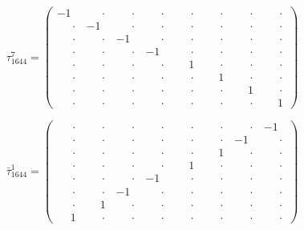 \documentclass[
  10pt,
]{article}
\begin{document}
\[
\tau_{1644}^{7} = \left(\begin{array}{rrrr|rrrr}
-1 & \phantom{-}\cdot & \phantom{-}\cdot & \phantom{-}\cdot & \phantom{-}\cdot & \phantom{-}\cdot & \phantom{-}\cdot & \phantom{-}\cdot \\[-1.8pt]
\phantom{-}\cdot & -1 & \phantom{-}\cdot & \phantom{-}\cdot & \phantom{-}\cdot & \phantom{-}\cdot & \phantom{-}\cdot & \phantom{-}\cdot \\[-1.8pt]
\phantom{-}\cdot & \phantom{-}\cdot & -1 & \phantom{-}\cdot & \phantom{-}\cdot & \phantom{-}\cdot & \phantom{-}\cdot & \phantom{-}\cdot \\[-1.8pt]
\phantom{-}\cdot & \phantom{-}\cdot & \phantom{-}\cdot & -1 & \phantom{-}\cdot & \phantom{-}\cdot & \phantom{-}\cdot & \phantom{-}\cdot \\[-1.8pt]
\hline
\phantom{-}\cdot & \phantom{-}\cdot & \phantom{-}\cdot & \phantom{-}\cdot & \phantom{-}1 & \phantom{-}\cdot & \phantom{-}\cdot & \phantom{-}\cdot \\[-1.8pt]
\phantom{-}\cdot & \phantom{-}\cdot & \phantom{-}\cdot & \phantom{-}\cdot & \phantom{-}\cdot & \phantom{-}1 & \phantom{-}\cdot & \phantom{-}\cdot \\[-1.8pt]
\phantom{-}\cdot & \phantom{-}\cdot & \phantom{-}\cdot & \phantom{-}\cdot & \phantom{-}\cdot & \phantom{-}\cdot & \phantom{-}1 & \phantom{-}\cdot \\[-1.8pt]
\phantom{-}\cdot & \phantom{-}\cdot & \phantom{-}\cdot & \phantom{-}\cdot & \phantom{-}\cdot & \phantom{-}\cdot & \phantom{-}\cdot & \phantom{-}1
\end{array}\right)
\]

\[
\bar\tau_{1644}^{1} = \left(\begin{array}{rrrr|rrrr}
\phantom{-}\cdot & \phantom{-}\cdot & \phantom{-}\cdot & \phantom{-}\cdot & \phantom{-}\cdot & \phantom{-}\cdot & \phantom{-}\cdot & -1 \\[-1.8pt]
\phantom{-}\cdot & \phantom{-}\cdot & \phantom{-}\cdot & \phantom{-}\cdot & \phantom{-}\cdot & \phantom{-}\cdot & -1 & \phantom{-}\cdot \\[-1.8pt]
\phantom{-}\cdot & \phantom{-}\cdot & \phantom{-}\cdot & \phantom{-}\cdot & \phantom{-}\cdot & \phantom{-}1 & \phantom{-}\cdot & \phantom{-}\cdot \\[-1.8pt]
\phantom{-}\cdot & \phantom{-}\cdot & \phantom{-}\cdot & \phantom{-}\cdot & \phantom{-}1 & \phantom{-}\cdot & \phantom{-}\cdot & \phantom{-}\cdot \\[-1.8pt]
\hline
\phantom{-}\cdot & \phantom{-}\cdot & \phantom{-}\cdot & -1 & \phantom{-}\cdot & \phantom{-}\cdot & \phantom{-}\cdot & \phantom{-}\cdot \\[-1.8pt]
\phantom{-}\cdot & \phantom{-}\cdot & -1 & \phantom{-}\cdot & \phantom{-}\cdot & \phantom{-}\cdot & \phantom{-}\cdot & \phantom{-}\cdot \\[-1.8pt]
\phantom{-}\cdot & \phantom{-}1 & \phantom{-}\cdot & \phantom{-}\cdot & \phantom{-}\cdot & \phantom{-}\cdot & \phantom{-}\cdot & \phantom{-}\cdot \\[-1.8pt]
\phantom{-}1 & \phantom{-}\cdot & \phantom{-}\cdot & \phantom{-}\cdot & \phantom{-}\cdot & \phantom{-}\cdot & \phantom{-}\cdot & \phantom{-}\cdot
\end{array}\right)
\]
\end{document}
